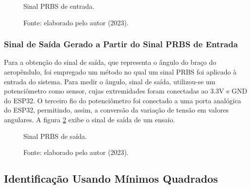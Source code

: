 \begin{figure}[!h]
	\centering
	\caption{Sinal PRBS de entrada.}
	\caption*{Fonte: elaborado pelo autor (2023).}
	\label{fig3:image_18}
\end{figure}



\subsubsection{Sinal de Saída Gerado a Partir do Sinal PRBS de Entrada}

Para a obtenção do sinal de saída, que representa o ângulo do braço do aeropêndulo, foi empregado um método no qual um sinal PRBS foi aplicado à entrada do sistema. Para medir o ângulo, sinal de saída, utilizou-se um potenciômetro como sensor, cujas extremidades foram conectadas ao 3.3V e GND do ESP32. O terceiro fio do potenciômetro foi conectado a uma porta analógica do ESP32, permitindo, assim, a conversão da variação de tensão em valores angulares. A figura \ref{fig3:image_19} exibe o sinal de saída de um ensaio.

\begin{figure}[!h]
	\centering
	\caption{Sinal PRBS de saída.}
	\caption*{Fonte: elaborado pelo autor (2023).}
	\label{fig3:image_19}
\end{figure}

\subsection{Identificação Usando Mínimos Quadrados}


